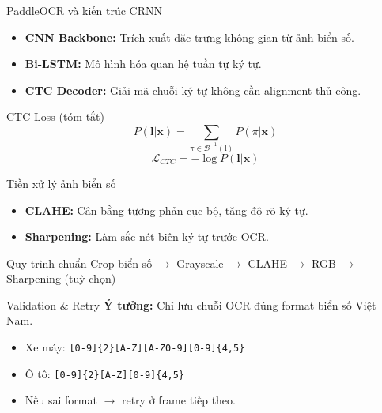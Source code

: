 \begin{frame}{PaddleOCR và kiến trúc CRNN}
    \begin{itemize}
        \item \textbf{CNN Backbone:} Trích xuất đặc trưng không gian từ ảnh biển số.
        \item \textbf{Bi-LSTM:} Mô hình hóa quan hệ tuần tự ký tự.
        \item \textbf{CTC Decoder:} Giải mã chuỗi ký tự không cần alignment thủ công.
    \end{itemize}

    \begin{block}{CTC Loss (tóm tắt)}
    \[ P(\mathbf{l} | \mathbf{x}) = \sum_{\pi \in \mathcal{B}^{-1}(\mathbf{l})} P(\pi | \mathbf{x}) \]
    \[ \mathcal{L}_{CTC} = -\log P(\mathbf{l} | \mathbf{x}) \]
    \end{block}
\end{frame}

\begin{frame}{Tiền xử lý ảnh biển số}
    \begin{itemize}
        \item \textbf{CLAHE:} Cân bằng tương phản cục bộ, tăng độ rõ ký tự.
        \item \textbf{Sharpening:} Làm sắc nét biên ký tự trước OCR.
    \end{itemize}

    \begin{block}{Quy trình chuẩn}
    Crop biển số $\rightarrow$ Grayscale $\rightarrow$ CLAHE $\rightarrow$ RGB $\rightarrow$ Sharpening (tuỳ chọn)
    \end{block}
\end{frame}

\begin{frame}{Validation \& Retry}
    \textbf{Ý tưởng:} Chỉ lưu chuỗi OCR đúng format biển số Việt Nam.
    \begin{itemize}
        \item Xe máy: \texttt{[0-9]\{2\}[A-Z][A-Z0-9][0-9]\{4,5\}}
        \item Ô tô: \texttt{[0-9]\{2\}[A-Z][0-9]\{4,5\}}
        \item Nếu sai format $\rightarrow$ retry ở frame tiếp theo.
    \end{itemize}
\end{frame}

